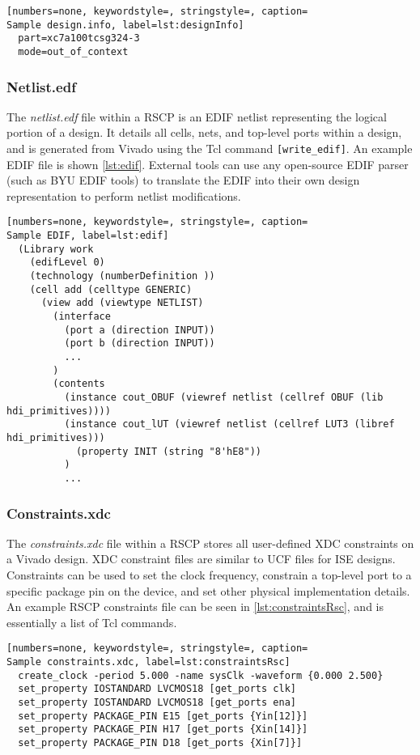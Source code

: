 \begin{lstlisting}[numbers=none, keywordstyle=, stringstyle=, caption=
Sample design.info, label=lst:designInfo]
  part=xc7a100tcsg324-3
  mode=out_of_context	
\end{lstlisting}

\subsubsection{Netlist.edf}
The \textit{netlist.edf} file within a RSCP is an EDIF netlist representing the
logical portion of a design. It details all cells, nets, and
top-level ports within a design, and is generated from Vivado using the Tcl
command \texttt{[write\_edif]}. An example EDIF file is shown
\autoref{lst:edif}. External tools can use any open-source EDIF parser (such as
BYU EDIF tools) to translate the EDIF into their own design representation to
perform netlist modifications.

\begin{lstlisting}[numbers=none, keywordstyle=, stringstyle=, caption=
Sample EDIF, label=lst:edif]
  (Library work
    (edifLevel 0)
    (technology (numberDefinition ))
    (cell add (celltype GENERIC)
      (view add (viewtype NETLIST)
        (interface
          (port a (direction INPUT))
          (port b (direction INPUT))
          ...
        )
        (contents
          (instance cout_OBUF (viewref netlist (cellref OBUF (lib hdi_primitives))))
          (instance cout_lUT (viewref netlist (cellref LUT3 (libref hdi_primitives))) 
            (property INIT (string "8'hE8"))
          )
          ...	
\end{lstlisting}

\subsubsection{Constraints.xdc}
The \textit{constraints.xdc} file within a RSCP stores all user-defined XDC
constraints on a Vivado design. XDC constraint files are similar to UCF files
for ISE designs. Constraints can be used to set the clock frequency, constrain
a top-level port to a specific package pin on the device, and set other
physical implementation details. An example RSCP constraints file can be
seen in \autoref{lst:constraintsRsc}, and is essentially a list of Tcl commands.

\begin{lstlisting}[numbers=none, keywordstyle=, stringstyle=, caption=
Sample constraints.xdc, label=lst:constraintsRsc]
  create_clock -period 5.000 -name sysClk -waveform {0.000 2.500}
  set_property IOSTANDARD LVCMOS18 [get_ports clk]
  set_property IOSTANDARD LVCMOS18 [get_ports ena]
  set_property PACKAGE_PIN E15 [get_ports {Yin[12]}]
  set_property PACKAGE_PIN H17 [get_ports {Xin[14]}]
  set_property PACKAGE_PIN D18 [get_ports {Xin[7]}]
\end{lstlisting}

